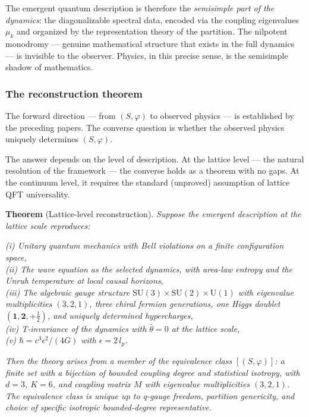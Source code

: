 \documentclass[
  11pt,
]{article}
\begin{document}
The emergent quantum description is therefore the \emph{semisimple part
of the dynamics}: the diagonalizable spectral data, encoded via the
coupling eigenvalues \(\mu_k\) and organized by the representation
theory of the partition. The nilpotent monodromy --- genuine
mathematical structure that exists in the full dynamics --- is invisible
to the observer. Physics, in this precise sense, is the semisimple
shadow of mathematics.

\hypertarget{the-reconstruction-theorem}{%
\subsubsection{The reconstruction
theorem}\label{the-reconstruction-theorem}}

The forward direction --- from \((S, \varphi)\) to observed physics ---
is established by the preceding papers. The converse question is whether
the observed physics uniquely determines \((S, \varphi)\).

The answer depends on the level of description. At the lattice level ---
the natural resolution of the framework --- the converse holds as a
theorem with no gaps. At the continuum level, it requires the standard
(unproved) assumption of lattice QFT universality.

\textbf{Theorem} (Lattice-level reconstruction). \emph{Suppose the
emergent description at the lattice scale reproduces:}

\emph{(i) Unitary quantum mechanics with Bell violations on a finite
configuration space,\\
(ii) The wave equation as the selected dynamics, with area-law entropy
and the Unruh temperature at local causal horizons,\\
(iii) The algebraic gauge structure
\(\mathrm{SU}(3) \times \mathrm{SU}(2) \times \mathrm{U}(1)\) with
eigenvalue multiplicities \((3, 2, 1)\), three chiral fermion
generations, one Higgs doublet
\((\mathbf{1}, \mathbf{2}, +\tfrac{1}{2})\), and uniquely determined
hypercharges,\\
(iv) T-invariance of the dynamics with \(\bar{\theta} = 0\) at the
lattice scale,\\
(v) \(\hbar = c^3 \epsilon^2 / (4G)\) with \(\epsilon = 2\,l_p\).}

\emph{Then the theory arises from a member of the equivalence class
\([(S, \varphi)]\): a finite set with a bijection of bounded coupling
degree and statistical isotropy, with \(d = 3\), \(K = 6\), and coupling
matrix \(M\) with eigenvalue multiplicities \((3, 2, 1)\). The
equivalence class is unique up to q-gauge freedom, partition genericity,
and choice of specific isotropic bounded-degree representative.}
\end{document}

